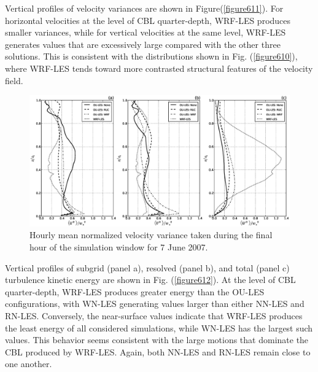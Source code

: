 Vertical profiles of velocity variances are shown in Figure(\autoref{figure611}). For horizontal velocities at the level of CBL quarter-depth, WRF-LES produces smaller variances, while for vertical velocities at the same level, WRF-LES generates values that are excessively large compared with the other three solutions. This is consistent with the distributions shown in Fig. (\autoref{figure610}), where WRF-LES tends toward more contrasted structural features of the velocity field. 


\begin{figure}[H]
\begin{center}
\includegraphics[width=\textwidth]{figures/chapter6/velocity_variance_20070607}
\end{center}
\caption{Hourly mean normalized velocity variance taken during the final hour of the simulation window for 7 June 2007.}
\label{figure611}
\end{figure}


Vertical profiles of subgrid (panel a), resolved (panel b), and total (panel c) turbulence kinetic energy are shown in Fig. (\autoref{figure612}). At the level of CBL quarter-depth, WRF-LES produces greater energy than the OU-LES configurations, with WN-LES generating values larger than either NN-LES and RN-LES. Conversely, the near-surface values indicate that WRF-LES produces the least energy of all considered simulations, while WN-LES has the largest such values. This behavior seems consistent with the large motions that dominate the CBL produced by WRF-LES. Again, both NN-LES and RN-LES remain close to one another. 


